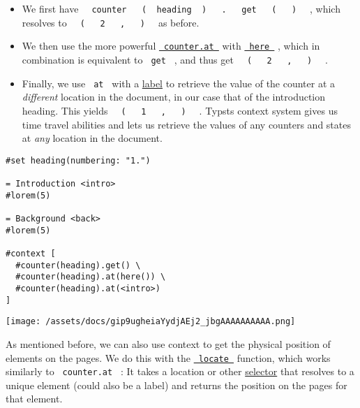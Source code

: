 \begin{itemize}
\tightlist
\item
  We first have
  \texttt{\ }{\texttt{\ counter\ }}\texttt{\ }{\texttt{\ (\ }}\texttt{\ heading\ }{\texttt{\ )\ }}\texttt{\ }{\texttt{\ .\ }}\texttt{\ }{\texttt{\ get\ }}\texttt{\ }{\texttt{\ (\ }}\texttt{\ }{\texttt{\ )\ }}\texttt{\ }
  , which resolves to
  \texttt{\ }{\texttt{\ (\ }}\texttt{\ }{\texttt{\ 2\ }}\texttt{\ }{\texttt{\ ,\ }}\texttt{\ }{\texttt{\ )\ }}\texttt{\ }
  as before.
\item
  We then use the more powerful
  \href{/docs/reference/introspection/counter/\#definitions-at}{\texttt{\ counter.at\ }}
  with \href{/docs/reference/introspection/here/}{\texttt{\ here\ }} ,
  which in combination is equivalent to \texttt{\ get\ } , and thus get
  \texttt{\ }{\texttt{\ (\ }}\texttt{\ }{\texttt{\ 2\ }}\texttt{\ }{\texttt{\ ,\ }}\texttt{\ }{\texttt{\ )\ }}\texttt{\ }
  .
\item
  Finally, we use \texttt{\ at\ } with a
  \href{/docs/reference/foundations/label/}{label} to retrieve the value
  of the counter at a \emph{different} location in the document, in our
  case that of the introduction heading. This yields
  \texttt{\ }{\texttt{\ (\ }}\texttt{\ }{\texttt{\ 1\ }}\texttt{\ }{\texttt{\ ,\ }}\texttt{\ }{\texttt{\ )\ }}\texttt{\ }
  . Typst\textquotesingle s context system gives us time travel
  abilities and lets us retrieve the values of any counters and states
  at \emph{any} location in the document.
\end{itemize}

\begin{verbatim}
#set heading(numbering: "1.")

= Introduction <intro>
#lorem(5)

= Background <back>
#lorem(5)

#context [
  #counter(heading).get() \
  #counter(heading).at(here()) \
  #counter(heading).at(<intro>)
]
\end{verbatim}

\texttt{[image: /assets/docs/gip9ugheiaYydjAEj2\_jbgAAAAAAAAAA.png]}

As mentioned before, we can also use context to get the physical
position of elements on the pages. We do this with the
\href{/docs/reference/introspection/locate/}{\texttt{\ locate\ }}
function, which works similarly to \texttt{\ counter.at\ } : It takes a
location or other \href{/docs/reference/foundations/selector/}{selector}
that resolves to a unique element (could also be a label) and returns
the position on the pages for that element.

